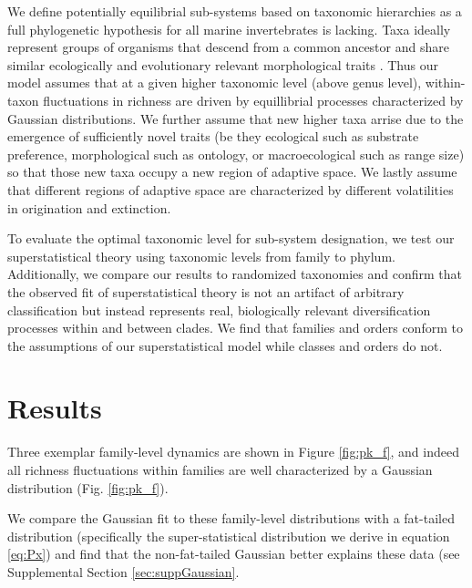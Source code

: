 \documentclass[12pt]{article}
\let\citep=\cite
\begin{document}
We define potentially equilibrial sub-systems based on taxonomic
hierarchies as a full phylogenetic hypothesis for all marine
invertebrates is lacking.  Taxa ideally represent groups of organisms
that descend from a common ancestor and share similar ecologically and
evolutionary relevant morphological traits \citep{mayr1965systZool,
  erwin2007, ezard2016}. Thus our model assumes that at a given higher
taxonomic level (above genus level), within-taxon fluctuations in
richness are driven by equillibrial processes characterized by
Gaussian distributions. We further assume that new higher taxa arrise
due to the emergence of sufficiently novel traits (be they ecological
such as substrate preference, morphological such as ontology, or
macroecological such as range size) so that those new taxa occupy a
new region of adaptive space. We lastly assume that different regions
of adaptive space are characterized by different volatilities in
origination and extinction.

To evaluate the optimal taxonomic level for sub-system designation, we
test our superstatistical theory using taxonomic levels from family to
phylum. Additionally, we compare our results to randomized taxonomies
and confirm that the observed fit of superstatistical theory is not an
artifact of arbitrary classification but instead represents real,
biologically relevant diversification processes within and between
clades. We find that families and orders conform to the assumptions of
our superstatistical model while classes and orders do not.

\section*{Results}

 Three
exemplar family-level dynamics are shown in Figure \ref{fig:pk_f}, and
indeed all richness fluctuations within families are well
characterized by a Gaussian distribution (Fig. \ref{fig:pk_f}).

We compare the Gaussian fit to these family-level distributions with a
fat-tailed distribution (specifically the super-statistical
distribution we derive in equation \ref{eq:Px}) and find that the
non-fat-tailed Gaussian better explains these data (see Supplemental
Section \ref{sec:suppGaussian}.
\end{document}
